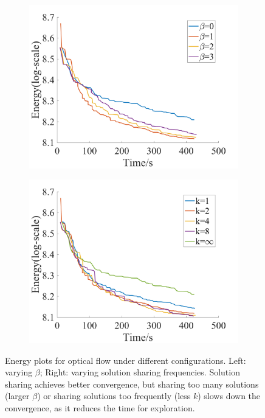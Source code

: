 \begin{figure}[!ht]
\centering
\begin{subfigure}[b]{0.49\columnwidth}
\includegraphics[width=\columnwidth]{figure/optical_flow_by_beta.png}
\end{subfigure}
\begin{subfigure}[b]{0.49\columnwidth}
\includegraphics[width=\columnwidth]{figure/optical_flow_by_interval.png}
\end{subfigure}
\caption{Energy
  plots for optical flow under different configurations. Left:
  varying $\beta$; Right: varying solution sharing
  frequencies. Solution sharing achieves better convergence, but
  sharing too many solutions (larger $\beta$) or sharing solutions too
  frequently (less $k$) slows down the convergence, as it reduces the
  time for exploration.} \label{fig:opticalflow_configuration}
\end{figure}
